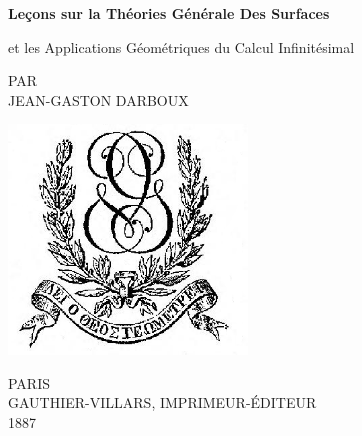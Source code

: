 \clearpage
\newcommand\nbvspace[1][3]{\vspace*{\stretch{#1}}}
\newcommand\nbstretchyspace{\spaceskip0.5em plus 0.25em minus 0.25em}
\newcommand{\nbtitlestretch}{\spaceskip0.6em}
\pagestyle{empty}
\begin{center}
\bfseries
\nbvspace[1]
\Huge
{\huge
Leçons sur la Théories Générale Des Surfaces}

\normalsize

et les Applications Géométriques du Calcul Infinitésimal

\nbvspace[1]
\small PAR\\
\Large JEAN-GASTON DARBOUX\\[0.5em]

\nbvspace[2]

\includegraphics[width=2.5in]{../images/Logo_Gauthier-Villars.png}
\nbvspace[3]
\normalsize

PARIS\\
\large
GAUTHIER-VILLARS, IMPRIMEUR-\'EDITEUR \\
1887
\nbvspace[1]
\end{center}
